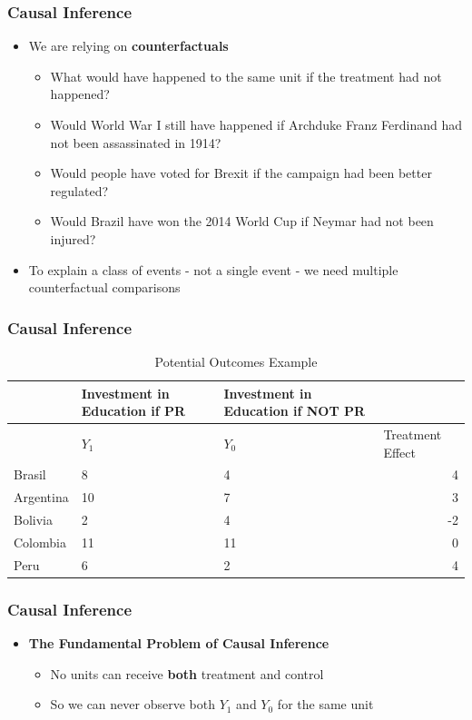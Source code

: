 \documentclass[xcolor=x11names,compress]{beamer}\usepackage[]{graphicx}\usepackage[]{color}
\renewcommand{\(}{\begin{columns}}
\renewcommand{\)}{\end{columns}}
\newcommand{\<}[1]{\begin{column}{#1}}
\renewcommand{\>}{\end{column}}
\begin{document}
\begin{frame}
\frametitle{Causal Inference}
\begin{itemize}
\item We are relying on \textbf{counterfactuals}
\pause
\begin{itemize}
\item What would have happened to the same unit if the treatment had not happened?
\pause
\item Would World War I still have happened if Archduke Franz Ferdinand had not been assassinated in 1914?
\pause
\item Would people have voted for Brexit if the campaign had been better regulated? 
\pause
\item Would Brazil have won the 2014 World Cup if Neymar had not been injured?
\pause
\end{itemize}
\item To explain a class of events - not a single event - we need multiple counterfactual comparisons
\end{itemize}
\end{frame}


\begin{frame}
\frametitle{Causal Inference}
\footnotesize
\begin{table}[htbp]
  \centering
  \caption{Potential Outcomes Example}
    \begin{tabular}{|l|p{2.4cm}|p{2.4cm}|r|}
    \hline
          & \multicolumn{1}{p{2.4cm}|}{Investment in Education if PR} & \multicolumn{1}{p{2.4cm}|}{Investment in Education if NOT PR} &  \bigstrut\\
    \hline
          & \multicolumn{1}{l|}{$Y_1$} & \multicolumn{1}{l|}{$Y_0$} & \multicolumn{1}{l|}{Treatment Effect} \bigstrut\\
    \hline
    Brasil & 8     & 4     & 4 \bigstrut\\
    \hline
    Argentina & 10    & 7     & 3 \bigstrut\\
    \hline
    Bolivia & 2     & 4     & -2 \bigstrut\\
    \hline
    Colombia & 11    & 11    & 0 \bigstrut\\
    \hline
    Peru & 6     & 2     & 4 \bigstrut\\
    \hline
    \end{tabular}%
  \label{tab:addlabel}%
\end{table}%
\normalsize
\end{frame}

\begin{frame}
\frametitle{Causal Inference}
\begin{itemize}
\item \textbf{The Fundamental Problem of Causal Inference}
\begin{itemize}
\item No units can receive \textbf{both} treatment and control
\item So we can never observe both $Y_1$ and $Y_0$ for the same unit
\end{itemize}
\end{itemize}
\end{frame}
\end{document}
